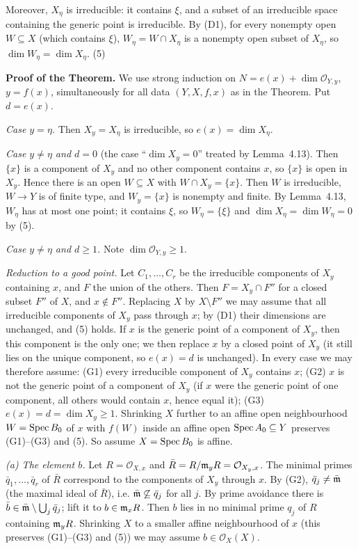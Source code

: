 \documentclass[11pt]{article}
\begin{document}
Moreover, $X_\eta$ is irreducible: it contains $\xi$, and a subset of an irreducible space containing the generic point is irreducible. By (D1), for every nonempty open $W\subseteq X$ (which contains $\xi$), $W_\eta=W\cap X_\eta$ is a nonempty open subset of $X_\eta$, so $\dim W_\eta=\dim X_\eta$. (5)

\textbf{Proof of the Theorem.} We use strong induction on $N=e(x)+\dim\mathcal O_{Y,y}$, $y=f(x)$, simultaneously for all data $(Y,X,f,x)$ as in the Theorem. Put $d=e(x)$.

\emph{Case $y=\eta$.} Then $X_y=X_\eta$ is irreducible, so $e(x)=\dim X_\eta$.

\emph{Case $y\neq\eta$ and $d=0$} (the case ``$\dim X_y=0$'' treated by Lemma~4.13). Then $\{x\}$ is a component of $X_y$ and no other component contains $x$, so $\{x\}$ is open in $X_y$. Hence there is an open $W\subseteq X$ with $W\cap X_y=\{x\}$. Then $W$ is irreducible, $W\to Y$ is of finite type, and $W_y=\{x\}$ is nonempty and finite. By Lemma~4.13, $W_\eta$ has at most one point; it contains $\xi$, so $W_\eta=\{\xi\}$ and $\dim X_\eta=\dim W_\eta=0$ by (5).

\emph{Case $y\neq\eta$ and $d\ge1$.} Note $\dim\mathcal O_{Y,y}\ge1$.

\emph{Reduction to a good point.} Let $C_1,\dots,C_r$ be the irreducible components of $X_y$ containing $x$, and $F$ the union of the others. Then $F=X_y\cap F''$ for a closed subset $F''$ of $X$, and $x\notin F''$. Replacing $X$ by $X\setminus F''$ we may assume that all irreducible components of $X_y$ pass through $x$; by (D1) their dimensions are unchanged, and (5) holds. If $x$ is the generic point of a component of $X_y$, then this component is the only one; we then replace $x$ by a closed point of $X_y$ (it still lies on the unique component, so $e(x)=d$ is unchanged). In every case we may therefore assume: (G1) every irreducible component of $X_y$ contains $x$; (G2) $x$ is not the generic point of a component of $X_y$ (if $x$ were the generic point of one component, all others would contain $x$, hence equal it); (G3) $e(x)=d=\dim X_y\ge1$. Shrinking $X$ further to an affine open neighbourhood $W=\operatorname{Spec} B_0$ of $x$ with $f(W)$ inside an affine open $\operatorname{Spec} A_0\subseteq Y$ preserves (G1)--(G3) and (5). So assume $X=\operatorname{Spec} B_0$ is affine.

\emph{(a) The element $b$.} Let $R=\mathcal O_{X,x}$ and $\bar R=R/\mathfrak m_y R=\mathcal O_{X_y,x}$. The minimal primes $\bar q_1,\dots,\bar q_r$ of $\bar R$ correspond to the components of $X_y$ through $x$. By (G2), $\bar q_j\neq\bar{\mathfrak m}$ (the maximal ideal of $\bar R$), i.e. $\bar{\mathfrak m}\not\subseteq\bar q_j$ for all $j$. By prime avoidance there is $\bar b\in\bar{\mathfrak m}\setminus\bigcup_j\bar q_j$; lift it to $b\in\mathfrak m_xR$. Then $b$ lies in no minimal prime $q_j$ of $R$ containing $\mathfrak m_yR$. Shrinking $X$ to a smaller affine neighbourhood of $x$ (this preserves (G1)--(G3) and (5)) we may assume $b\in\mathcal O_X(X)$.
\end{document}
